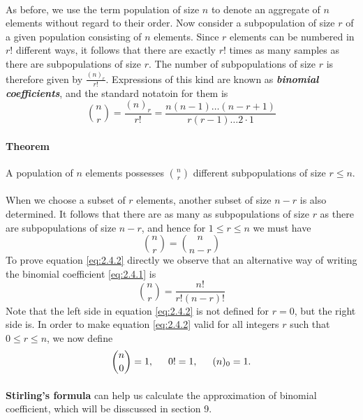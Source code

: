 \documentclass{article}
\numberwithin{equation}{subsection}
\begin{document}
			\paragraph{} As before, we use the term population of size $n$ to denote an aggregate of $n$ elements without regard to their order. Now consider a subpopulation of size $r$ of a given population consisting of $n$ elements. Since $r$ elements can be numbered in $r!$ different ways, it follows that there are exactly $r!$ times as many samples as there are subpopulations of size $r$. The number of subpopulations of size $r$ is therefore given by $\frac{(n)_r}{r!}$. Expressions of this kind are known as \textit{\textbf{binomial coefficients}}, and the standard notatoin for them is
			\begin{equation}
				\label{eq:2.4.1}
				{n \choose r} = \frac{(n)_r}{r!} = \frac{n(n-1)\dots(n-r+1)}{r(r-1)\dots 2\cdot 1}
			\end{equation}
			\paragraph{Theorem} A population of $n$ elements possesses $n \choose r$ different subpopulations of size $r \leq n$.
			\paragraph{} When we choose a subset of $r$ elements, another subset of size $n-r$ is also determined. It follows that there are as many as subpopulations of size $r$ as there are subpopulations of size $n-r$, and hence for $1 \leq r \leq n$ we must have
			\begin{equation}
				\label{eq:2.4.2}
				{n \choose r} = {n \choose n-r}
			\end{equation}
			To prove equation \eqref{eq:2.4.2} directly we observe that an alternative way of writing the binomial coefficient \eqref{eq:2.4.1} is
			\begin{equation}
				\label{eq:2.4.3}
				{n \choose r} = \frac{n!}{r!(n-r)!}
			\end{equation}
			Note that the left side in equation \eqref{eq:2.4.2} is not defined for $r=0$, but the right side is. In order to make equation \eqref{eq:2.4.2} valid for all integers $r$ such that $0\leq r\leq n$, we now define
			\begin{equation}
				{n \choose 0} = 1,\indent 0! = 1,\indent(n)_0 = 1.
			\end{equation}
			\paragraph{}\textbf{Stirling's formula} can help us calculate the approximation of binomial coefficient, which will be disscussed in section 9.
\end{document}
